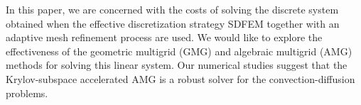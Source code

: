 \documentclass{report}
\begin{document}
In this paper, we are concerned with the costs of solving the
discrete system obtained when the effective discretization
strategy SDFEM together with an adaptive mesh refinement process
are used. We would like to explore the effectiveness of the
geometric multigrid (GMG) and algebraic multigrid (AMG) methods
for solving this linear system. Our numerical studies suggest that the
Krylov-subspace accelerated AMG is a robust solver for the
convection-diffusion problems.
\end{document}
